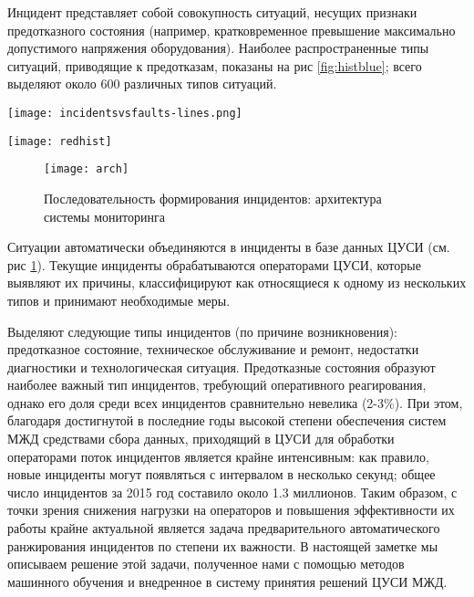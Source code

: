 Инцидент представляет собой совокупность ситуаций, несущих признаки предотказного состояния (например, кратковременное превышение максимально допустимого напряжения оборудования). Наиболее распространенные типы ситуаций, приводящие к предотказам, показаны на рис \ref{fig:histblue}; всего выделяют около 600 различных типов ситуаций. %

\begin{figure*}
\centering
\texttt{[image: incidentsvsfaults-lines.png]}
\caption{Наиболее распространённые типы ситуаций, приводящих к предотказу}
\centering
\label{fig:histblue}
\end{figure*}

\begin{figure*}[t]
\centering
\texttt{[image: redhist]}
\caption{Наиболее распространённые типы ситуаций устройств телемеханики, приводящие к предотказу}
\centering
\label{fig:histred}
\end{figure*}

\begin{figure}[t]
\centering
\texttt{[image: arch]}
\caption{Последовательность формирования инцидентов: архитектура системы мониторинга}
\centering
\label{fig:arch}
\end{figure}

Ситуации автоматически объединяются в инциденты в базе данных ЦУСИ (см. рис \ref{fig:arch}). Текущие инциденты обрабатываются операторами ЦУСИ, которые выявляют их причины, классифицируют как относящиеся к одному из нескольких типов и принимают необходимые меры.

Выделяют следующие типы инцидентов (по причине возникновения): предотказное состояние, техническое обслуживание и ремонт, недостатки диагностики и технологическая ситуация. Предотказные состояния образуют наиболее важный тип инцидентов, требующий оперативного реагирования, однако его доля среди всех инцидентов сравнительно невелика (2-3\%). При этом, благодаря достигнутой в последние годы высокой степени обеспечения систем МЖД средствами сбора данных, приходящий в ЦУСИ для обработки операторами поток инцидентов является крайне интенсивным: как правило, новые инциденты могут появляться с интервалом в несколько секунд; общее число инцидентов за 2015 год составило около 1.3 миллионов.
Таким образом, с точки зрения снижения нагрузки на операторов и повышения эффективности их работы крайне актуальной является задача предварительного автоматического ранжирования инцидентов по степени их важности. В настоящей заметке мы описываем решение этой задачи, полученное нами с помощью методов машинного обучения и внедренное в систему принятия решений ЦУСИ МЖД.

